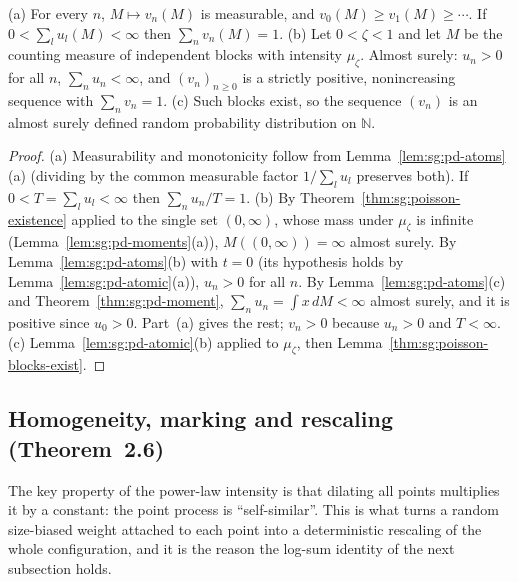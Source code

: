 \begin{theorem}\label{thm:sg:pd-weights}
  \leanok
(a) For every $n$, $M\mapsto v_n(M)$ is measurable, and $v_0(M)\ge v_1(M)\ge\cdots$. If $0<\sum_lu_l(M)<\infty$ then $\sum_nv_n(M)=1$. (b) Let $0<\zeta<1$ and let $M$ be the counting measure of independent blocks with intensity $\mu_\zeta$. Almost surely: $u_n>0$ for all $n$, $\sum_nu_n<\infty$, and $(v_n)_{n\ge0}$ is a strictly positive, nonincreasing sequence with $\sum_nv_n=1$. (c) Such blocks exist, so the sequence $(v_n)$ is an almost surely defined random probability distribution on $\mathbb N$.
\end{theorem}

\begin{proof}
  \leanok
{}
(a) Measurability and monotonicity follow from Lemma~\ref{lem:sg:pd-atoms}(a) (dividing by the common measurable factor $1/\sum_lu_l$ preserves both). If $0<T=\sum_lu_l<\infty$ then $\sum_nu_n/T=1$. (b) By Theorem~\ref{thm:sg:poisson-existence} applied to the single set $(0,\infty)$, whose mass under $\mu_\zeta$ is infinite (Lemma~\ref{lem:sg:pd-moments}(a)), $M((0,\infty))=\infty$ almost surely. By Lemma~\ref{lem:sg:pd-atoms}(b) with $t=0$ (its hypothesis holds by Lemma~\ref{lem:sg:pd-atomic}(a)), $u_n>0$ for all $n$. By Lemma~\ref{lem:sg:pd-atoms}(c) and Theorem~\ref{thm:sg:pd-moment}, $\sum_nu_n=\int x\,dM<\infty$ almost surely, and it is positive since $u_0>0$. Part~(a) gives the rest; $v_n>0$ because $u_n>0$ and $T<\infty$. (c) Lemma~\ref{lem:sg:pd-atomic}(b) applied to $\mu_\zeta$, then Lemma~\ref{thm:sg:poisson-blocks-exist}.
\end{proof}

\subsection*{Homogeneity, marking and rescaling (Theorem~2.6)}\label{sec:sg:pd-marking}

The key property of the power-law intensity is that dilating all points multiplies it by a constant: the point process is ``self-similar''. This is what turns a random size-biased weight attached to each point into a deterministic rescaling of the whole configuration, and it is the reason the log-sum identity of the next subsection holds.

